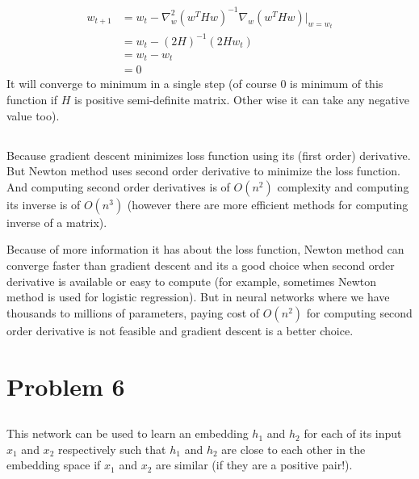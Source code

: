 \documentclass[]{article}
\numberwithin{equation}{section}
\newcommand{\transpose}{^T}
\newcommand{\inverse}{^{-1}}
\newcommand{\at}[2][]{#1|_{#2}}
\begin{document}
\subsection{}
\begin{align}
w_{t+1} &= w_{t} - \nabla^2_{w} (w\transpose H w)\inverse \nabla_w (w\transpose H w)\at{w=w_t} \\
&= w_t - (2H)\inverse (2H w_t)\\
&= w_t - w_t\\
&= 0
\end{align}
It will converge to minimum in a single step (of course \(0\) is minimum of this function if \(H\) is positive semi-definite matrix. Other wise it can take any negative value too).

\subsection{}
Because gradient descent minimizes loss function using its (first order) derivative.
But Newton method uses second order derivative to minimize the loss function. 
And computing second order derivatives is of \(O(n^2)\) complexity and computing its inverse is of \( O(n^3) \) (however there are more efficient methods for computing inverse of a matrix).

Because of more information it has about the loss function, Newton method can converge faster than gradient descent and its a good choice when second order derivative is available or easy to compute (for example, sometimes Newton method is used for logistic regression).
But in neural networks where we have thousands to millions of parameters, paying cost of \(O(n^2)\) for computing second order derivative is not feasible and gradient descent is a better choice.


\section{Problem 6}
\subsection{}
This network can be used to learn an embedding \(h_1\) and \(h_2\) for each of its input \(x_1\) and \(x_2\) respectively such that \(h_1\) and \(h_2\) are close to each other in the embedding space if \(x_1\) and \(x_2\) are similar (if they are a positive pair!).
\end{document}

